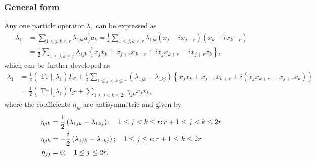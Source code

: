 \documentclass[aps, preprint]{revtex4}
\begin{document}
\subsubsection{General form}
Any one particle operator $\lambda _{1}$ can be expressed as
\begin{align}\lambda _{1} &  =\sum _{1 \leq j ,k \leq r}\lambda _{1 j k} a_{j}^{ \dag } a_{k} =\frac{1}{2} \sum _{1 \leq j ,k \leq r}\lambda _{1 j k} \left (x_{j} -i x_{j +r}\right ) \left (x_{k} +i x_{k +r}\right ) \nonumber  \\
 &  =\frac{1}{2} \sum _{1 \leq j ,k \leq r}\lambda _{1 j k} \left \{x_{j} x_{k} +x_{j +r} x_{k +r} +i x_{j} x_{k +r} -i x_{j +r} x_{k}\right \}\text{,}\end{align}which can be further developed as
\begin{align}\lambda _{1} &  =\frac{1}{2} \left (\left .\ensuremath{\operatorname*{Tr}}\right \vert _{1} \lambda _{1}\right ) I_{\mathcal{F}} +\frac{1}{2} \sum _{1 \leq j <k \leq r}\left (\lambda _{1 j k} -\lambda _{1 k j}\right ) \left \{x_{j} x_{k} +x_{j +r} x_{k +r} +i \left (x_{j} x_{k +r} -x_{j +r} x_{k}\right )\right \} \nonumber  \\
 &  =\frac{1}{2} \left (\left .\ensuremath{\operatorname*{Tr}}\right \vert _{1} \lambda _{1}\right ) I_{\mathcal{F}} +\sum _{1 \leq j <k \leq 2 r}\eta _{j k} x_{j} x_{k}\text{,}\end{align}where the coefficients $\eta _{j k}$ are antisymmetric and given by
\begin{align}\eta _{j k} &  =\frac{1}{2} \left (\lambda _{1 j k} -\lambda _{1 k j}\right ) ;\text{\quad }1 \leq j <k \leq r ;r +1 \leq j <k \leq 2 r \\
\eta _{j k} &  = -\frac{i}{2} \left (\lambda _{1 j k} -\lambda _{1 k j}\right ) ;\text{\quad }1 \leq j \leq r ;r +1 \leq k \leq 2 r \\
\eta _{j j} &  =0 ;\text{\quad }1 \leq j \leq 2 r\text{.}\end{align}
\end{document}
